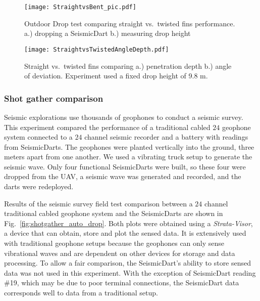 \begin{figure} \centering
  {\texttt{[image: StraightvsBent\_pic.pdf]}}
 \caption{Outdoor Drop test comparing straight vs.\ twisted fins performance.
 a.)  dropping a SeismicDart  
 b.)  measuring drop height} 
 \label{fig:StraightBentPic}
 \vspace{-1em}
\end{figure}
\begin{figure} \centering
  {\texttt{[image: StraightvsTwistedAngleDepth.pdf]}}
 \caption{\label{fig:StraightBentDepth}Straight vs.\ twisted fins comparing a.) penetration depth b.) angle of deviation. Experiment used a fixed drop height of 9.8 m.} 
\end{figure}

\subsubsection{Shot gather comparison} 
Seismic explorations use thousands of geophones to conduct a seismic survey. 
This experiment compared the performance of a traditional cabled $24$ geophone system connected to a $24$ channel seismic recorder and a battery with readings from SeismicDarts.
The geophones were planted vertically into the ground, three meters apart from one another.  
We used a vibrating truck setup to generate the seismic wave. 
Only four functional SeismicDarts were built, so these four were dropped from the UAV, a seismic wave was generated and recorded, and the darts were redeployed.

Results of the seismic survey field test comparison between a $24$ channel traditional cabled geophone system and the SeismicDarts are shown in Fig.~\ref{fig:shotgather_auto_drop}.   
Both plots were obtained using a \emph{Strata-Visor}, a device that can obtain, store and plot the sensed data. 
It is extensively used with traditional geophone setups because the geophones can only sense vibrational waves and are dependent on other devices for storage and data processing. 
To allow a fair comparison, the SeismicDart's  ability to store sensed data was not used in this experiment. 
With the exception of SeismicDart reading \#19, which may be due to poor terminal connections, the SeismicDart data corresponds well to data from a traditional setup.


